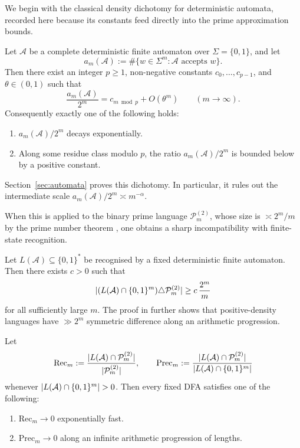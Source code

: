We begin with the classical density dichotomy for deterministic
automata, recorded here because its constants feed directly into the
prime approximation bounds.

\begin{theorem}\label{thm:intro-density}
Let \(\mathcal A\) be a complete deterministic finite automaton over
\(\Sigma=\{0,1\}\), and let
\[
  a_m(\mathcal A)
  :=\#\{w\in\Sigma^m:\mathcal A\text{ accepts }w\}.
\]
Then there exist an integer \(p\ge 1\), non-negative constants
\(c_0,\dots,c_{p-1}\), and \(\theta\in(0,1)\) such that
\[
  \frac{a_m(\mathcal A)}{2^m}=c_{m\bmod p}+O(\theta^m)
  \qquad (m\to\infty).
\]
Consequently exactly one of the following holds:
\begin{enumerate}[label=\textup{(\roman*)}]
  \item \(a_m(\mathcal A)/2^m\) decays exponentially.
  \item Along some residue class modulo \(p\), the ratio
  \(a_m(\mathcal A)/2^m\) is bounded below by a positive constant.
\end{enumerate}
Section~\ref{sec:automata} proves this dichotomy. In particular, it
rules out the intermediate scale \(a_m(\mathcal A)/2^m\asymp m^{-\alpha}\).
\end{theorem}

When this is applied to the binary prime language
\(\mathcal P_m^{(2)}\), whose size is \(\asymp 2^m/m\) by the prime
number theorem \cite{HardyWright2008}, one obtains a sharp
incompatibility with finite-state recognition.

\begin{corollary}
  \label{cor:intro-binary-primes}
Let \(L(\mathcal A)\subseteq\{0,1\}^\ast\) be recognised by a fixed
deterministic finite automaton. Then there exists \(c>0\) such that
\[
  \lvert (L(\mathcal A)\cap\{0,1\}^m)\triangle\mathcal P_m^{(2)} \rvert
  \ge c\,\frac{2^m}{m}
\]
for all sufficiently large \(m\). The proof in
 further shows that positive-density languages have
\(\gg 2^m\) symmetric difference along an arithmetic progression.
\end{corollary}

\begin{corollary}
  \label{cor:intro-binary-precision}
  Let
  \[
    \mathrm{Rec}_m
    :=\frac{\lvert L(\mathcal A)\cap\mathcal P_m^{(2)} \rvert}
            {\lvert \mathcal P_m^{(2)} \rvert},
    \qquad
    \mathrm{Prec}_m
    :=\frac{\lvert L(\mathcal A)\cap\mathcal P_m^{(2)} \rvert}
            {\lvert L(\mathcal A)\cap\{0,1\}^m \rvert}
  \]
  whenever \(\lvert L(\mathcal A)\cap\{0,1\}^m \rvert>0\). Then every fixed DFA
  satisfies one of the following:
  \begin{enumerate}[label=\textup{(\roman*)}]
    \item \(\mathrm{Rec}_m\to 0\) exponentially fast.
    \item \(\mathrm{Prec}_m\to 0\) along an infinite arithmetic
    progression of lengths.
  \end{enumerate}
\end{corollary}


